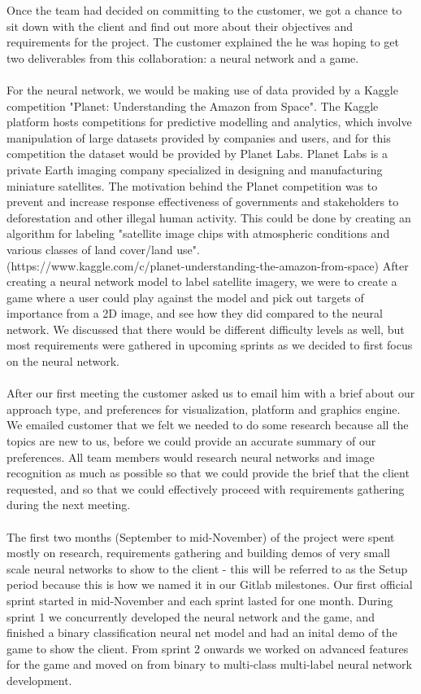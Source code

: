 \documentclass{l3proj}
\begin{document}
Once the team had decided on committing to the customer, we got a chance to sit down with the client and find out more about their objectives and requirements for the project. The customer explained the he was hoping to get two deliverables from this collaboration: a neural network and a game.
\\\\
For the neural network, we would be making use of data provided by a Kaggle competition "Planet: Understanding the Amazon from Space". The Kaggle platform hosts competitions for predictive modelling and analytics, which involve manipulation of large datasets provided by companies and users, and for this competition the dataset would be provided by Planet Labs. Planet Labs is a private Earth imaging company specialized in designing and manufacturing miniature satellites. The motivation behind the Planet competition was to prevent and increase response effectiveness of governments and stakeholders to deforestation and other illegal human activity. This could be done by creating an algorithm for labeling "satellite image chips with atmospheric conditions and various classes of land cover/land use".
\\
(https://www.kaggle.com/c/planet-understanding-the-amazon-from-space)
After creating a neural network model to label satellite imagery, we were to create a game where a user could play against the model and pick out targets of importance from a 2D image, and see how they did compared to the neural network. We discussed that there would be different difficulty levels as well, but most requirements were gathered in upcoming sprints as we decided to first focus on the neural network.
\\\\
After our first meeting the customer asked us to email him with a brief about our approach type, and preferences for visualization, platform and graphics engine. We emailed customer that we felt we needed to do some research because all the topics are new to us, before we could provide an accurate summary of our preferences. All team members would research neural networks and image recognition as much as possible so that we could provide the brief that the client requested, and so that we could effectively proceed with requirements gathering during the next meeting.
\\\\
The first two months (September to mid-November) of the project were spent mostly on research, requirements gathering and building demos of very small scale neural networks to show to the client - this will be referred to as the Setup period because this is how we named it in our Gitlab milestones. Our first official sprint started in mid-November and each sprint lasted for one month. During sprint 1 we concurrently developed the neural network and the game, and finished a binary classification neural net model and had an inital demo of the game to show the client. From sprint 2 onwards we worked on advanced features for the game and moved on from binary to multi-class multi-label neural network development.
\end{document}
